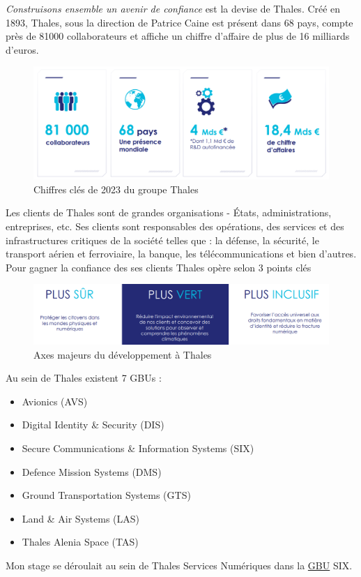 \documentclass[a4paper, 12pt]{article}
\begin{document}
\og{}\emph{Construisons ensemble un avenir de confiance}\fg{} est la devise de Thales. Créé en 1893, Thales, sous la direction de Patrice Caine est présent dans 68 pays, compte près de 81000 collaborateurs et affiche un chiffre d'affaire de plus de 16 milliards d'euros. \\

\begin{figure}[h]
	\centering
	\includegraphics[width=\textwidth]{img/thales_pres.png}
	\caption{Chiffres clés de 2023 du groupe Thales}
	\label{chiffres2023}
\end{figure}

Les clients de Thales sont de grandes organisations - États, administrations, entreprises, etc. Ses clients sont responsables des opérations, des services et des infrastructures critiques de la société telles que : la défense, la sécurité, le transport aérien et ferroviaire, la banque, les télécommunications et bien d’autres.
Pour gagner la confiance des ses clients Thales opère selon 3 points clés 

\begin{figure}[h]
	\centering
	\includegraphics[width=\textwidth]{img/thales_mission.png}
	\caption{Axes majeurs du développement à Thales}
	\label{thalesmission}
\end{figure}

\noindent Au sein de Thales existent 7 GBUs : 
\begin{itemize}
	\item Avionics (AVS)
	\item Digital Identity \& Security (DIS) 
	\item Secure Communications \& Information Systems (SIX) 
	\item Defence Mission Systems (DMS)  
	\item Ground Transportation Systems (GTS)
	\item Land \& Air Systems (LAS)
	\item Thales Alenia Space (TAS)
\end{itemize}
Mon stage se déroulait au sein de Thales Services Numériques dans la \hyperref[GBU]{GBU} SIX.
\end{document}
